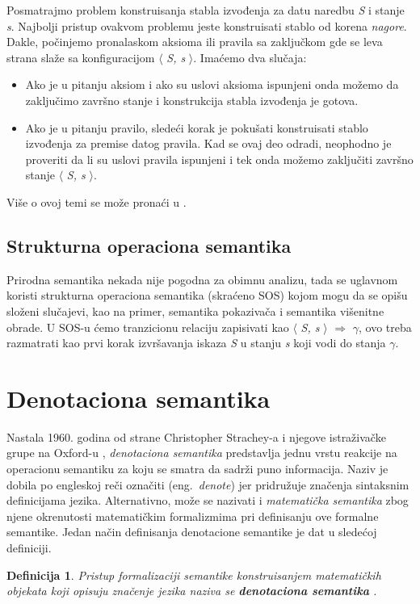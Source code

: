 \documentclass[a4paper]{article}
\newtheorem{definicija}{Definicija}[section]
\begin{document}
Posmatrajmo problem konstruisanja stabla izvođenja za datu naredbu \textit{S} i stanje \textit{s}. Najbolji pristup ovakvom problemu jeste konstruisati stablo od korena \textit{nagore}. Dakle, počinjemo pronalaskom aksioma ili pravila sa zaključkom gde se leva strana slaže sa konfiguracijom $\langle$ \textit{S, s} $\rangle$. Imaćemo dva slučaja:
\begin{itemize}
	\item Ako je u pitanju aksiom i ako su uslovi aksioma ispunjeni onda možemo da zaključimo završno stanje i konstrukcija stabla izvođenja je gotova.
	\item Ako je u pitanju pravilo, sledeći korak je pokušati konstruisati stablo izvođenja za premise datog pravila. Kad se ovaj deo odradi, neophodno je proveriti da li su uslovi pravila ispunjeni i tek onda možemo zaključiti završno stanje  $\langle$ \textit{S, s} $\rangle$.
\end{itemize}
Više o ovoj temi se može pronaći u \cite{willey, opersem}.

\subsection{Strukturna operaciona semantika}
Prirodna semantika nekada nije pogodna za obimnu analizu, tada se uglavnom koristi strukturna operaciona semantika (skraćeno SOS) kojom mogu da se opišu složeni slučajevi, kao na primer, semantika pokazivača i semantika višenitne obrade. U SOS-u ćemo tranzicionu relaciju zapisivati kao $\langle$ \textit{S, s} $\rangle$ $\Longrightarrow$ \textit{$\gamma$}, ovo treba razmatrati kao {\emp prvi korak} izvršavanja iskaza \textit{S} u stanju \textit{s} koji vodi do stanja \textit{$\gamma$}.

\section{Denotaciona semantika}
\label{sec:densem}

\qquad Nastala 1960. godina od strane Christopher Strachey-a i njegove istraživačke grupe na Oxford-u \cite{slonneger1995book}, \textit{denotaciona semantika} predstavlja jednu vrstu reakcije na operacionu semantiku za koju se smatra da sadrži puno informacija. Naziv je dobila po engleskoj reči označiti (eng.~{\em denote}) jer pridružuje značenja sintaksnim definicijama jezika. Alternativno, može se nazivati i \textit{matematička semantika} zbog njene okrenutosti matematičkim formalizmima pri definisanju ove formalne semantike. Jedan način definisanja denotacione semantike je dat u sledećoj definiciji.
\begin{definicija}
Pristup formalizaciji semantike konstruisanjem matematičkih objekata koji
opisuju značenje jezika naziva se \textbf{denotaciona semantika} \cite{milena}.
\end{definicija}
\end{document}
